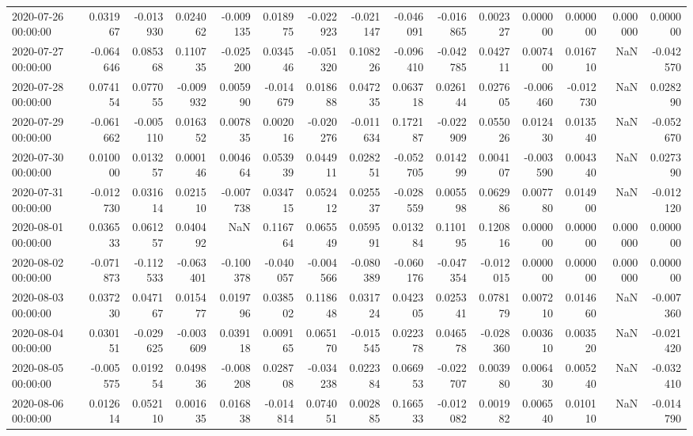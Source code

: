 \begin{tabular}{lrrrrrrrrrrrrrr}
2020-07-26 00:00:00 & 0.031967 & -0.013930 & 0.024062 & -0.009135 & 0.018975 & -0.022923 & -0.021147 & -0.046091 & -0.016865 & 0.002327 & 0.000000 & 0.000000 & 0.000000 & 0.000000 \\
2020-07-27 00:00:00 & -0.064646 & 0.085368 & 0.110735 & -0.025200 & 0.034546 & -0.051320 & 0.108226 & -0.096410 & -0.042785 & 0.042711 & 0.007400 & 0.016710 & NaN & -0.042570 \\
2020-07-28 00:00:00 & 0.074154 & 0.077055 & -0.009932 & 0.005990 & -0.014679 & 0.018688 & 0.047235 & 0.063718 & 0.026144 & 0.027605 & -0.006460 & -0.012730 & NaN & 0.028290 \\
2020-07-29 00:00:00 & -0.061662 & -0.005110 & 0.016352 & 0.007835 & 0.002016 & -0.020276 & -0.011634 & 0.172187 & -0.022909 & 0.055026 & 0.012430 & 0.013540 & NaN & -0.052670 \\
2020-07-30 00:00:00 & 0.010000 & 0.013257 & 0.000146 & 0.004664 & 0.053939 & 0.044911 & 0.028251 & -0.052705 & 0.014299 & 0.004107 & -0.003590 & 0.004340 & NaN & 0.027390 \\
2020-07-31 00:00:00 & -0.012730 & 0.031614 & 0.021510 & -0.007738 & 0.034715 & 0.052412 & 0.025537 & -0.028559 & 0.005598 & 0.062986 & 0.007780 & 0.014900 & NaN & -0.012120 \\
2020-08-01 00:00:00 & 0.036533 & 0.061257 & 0.040492 & NaN & 0.116764 & 0.065549 & 0.059591 & 0.013284 & 0.110195 & 0.120816 & 0.000000 & 0.000000 & 0.000000 & 0.000000 \\
2020-08-02 00:00:00 & -0.071873 & -0.112533 & -0.063401 & -0.100378 & -0.040057 & -0.004566 & -0.080389 & -0.060176 & -0.047354 & -0.012015 & 0.000000 & 0.000000 & 0.000000 & 0.000000 \\
2020-08-03 00:00:00 & 0.037230 & 0.047167 & 0.015477 & 0.019796 & 0.038502 & 0.118648 & 0.031724 & 0.042305 & 0.025341 & 0.078179 & 0.007210 & 0.014660 & NaN & -0.007360 \\
2020-08-04 00:00:00 & 0.030151 & -0.029625 & -0.003609 & 0.039118 & 0.009165 & 0.065170 & -0.015545 & 0.022378 & 0.046578 & -0.028360 & 0.003610 & 0.003520 & NaN & -0.021420 \\
2020-08-05 00:00:00 & -0.005575 & 0.019254 & 0.049836 & -0.008208 & 0.028708 & -0.034238 & 0.022384 & 0.066953 & -0.022707 & 0.003980 & 0.006430 & 0.005240 & NaN & -0.032410 \\
2020-08-06 00:00:00 & 0.012614 & 0.052110 & 0.001635 & 0.016838 & -0.014814 & 0.074051 & 0.002885 & 0.166533 & -0.012082 & 0.001982 & 0.006540 & 0.010110 & NaN & -0.014790 \\

\end{tabular}
